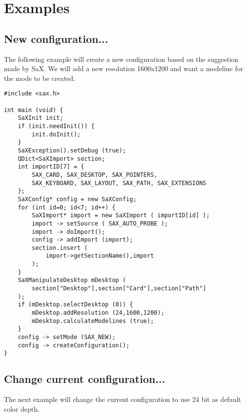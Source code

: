 \chapter{Examples}

\section{New configuration...}
The following example will create a new configuration based on the
suggestion made by SaX. We will add a new resolution 1600x1200 and
want a modeline for the mode to be created.

\begin{Command}{12cm}
\begin{small}
\begin{verbatim}
#include <sax.h>

int main (void) {
    SaXInit init;
    if (init.needInit()) {
        init.doInit();
    }
    SaXException().setDebug (true);
    QDict<SaXImport> section;
    int importID[7] = {
        SAX_CARD, SAX_DESKTOP, SAX_POINTERS,
        SAX_KEYBOARD, SAX_LAYOUT, SAX_PATH, SAX_EXTENSIONS
    };
    SaXConfig* config = new SaXConfig;
    for (int id=0; id<7; id++) {
        SaXImport* import = new SaXImport ( importID[id] );
        import -> setSource ( SAX_AUTO_PROBE );
        import -> doImport();
        config -> addImport (import);
        section.insert (
            import->getSectionName(),import
        );
    }
    SaXManipulateDesktop mDesktop (
        section["Desktop"],section["Card"],section["Path"]
    );
    if (mDesktop.selectDesktop (0)) {
        mDesktop.addResolution (24,1600,1200);
        mDesktop.calculateModelines (true);
    }
    config -> setMode (SAX_NEW);
    config -> createConfiguration();
}
\end{verbatim}
\end{small}
\end{Command}

\newpage

\section{Change current configuration...}
The next example will change the current configuration to use
24 bit as default color depth.

